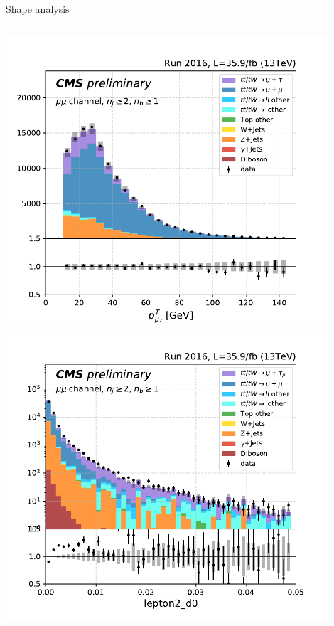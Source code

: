 \begin{frame}{Shape analysis}
\begin{columns}
        \begin{center}
            \includegraphics[width=0.9\textwidth]{chapters/Analysis/sectionPlots/figures/kinematics_pickles/mumu/12b/mumu_2b_lepton2_pt.pdf}
            \includegraphics[width=0.9\textwidth]{chapters/Analysis/sectionSelection/figures/sob/mumu_lepton2_d0_logscale.pdf}
        \end{center}

    \end{columns}

\end{frame}


